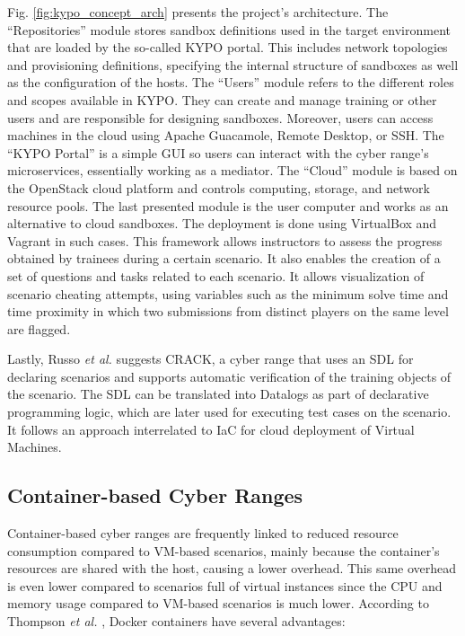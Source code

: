 Fig. \ref{fig:kypo_concept_arch} presents the project's architecture. The ``Repositories'' module stores sandbox definitions used in the target environment that are loaded by the so-called KYPO portal. This includes network topologies and provisioning definitions, specifying the internal structure of sandboxes as well as the configuration of the hosts. The ``Users'' module refers to the different roles and scopes available in KYPO. They can create and manage training or other users and are responsible for designing sandboxes. Moreover, users can access machines in the cloud using Apache Guacamole, Remote Desktop, or SSH. The ``KYPO Portal'' is a simple GUI so users can interact with the cyber range's microservices, essentially working as a mediator. The ``Cloud'' module is based on the OpenStack cloud platform and controls computing, storage, and network resource pools. The last presented module is the user computer and works as an alternative to cloud sandboxes. The deployment is done using VirtualBox and Vagrant in such cases. This framework allows instructors to assess the progress obtained by trainees during a certain scenario. It also enables the creation of a set of questions and tasks related to each scenario. It allows visualization of scenario cheating attempts, using variables such as the minimum solve time and time proximity in which two submissions from distinct players on the same level are flagged.

Lastly, Russo \textit{et al.} \cite{crack_ref} suggests CRACK, a cyber range that uses an SDL for declaring scenarios and supports automatic verification of the training objects of the scenario. The SDL can be translated into Datalogs as part of declarative programming logic, which are later used for executing test cases on the scenario. It follows an approach interrelated to IaC for cloud deployment of Virtual Machines. 

\subsection{Container-based Cyber Ranges}

Container-based cyber ranges are frequently linked to reduced resource consumption compared to VM-based scenarios, mainly because the container's resources are shared with the host, causing a lower overhead. This same overhead is even lower compared to scenarios full of virtual instances since the CPU and memory usage compared to VM-based scenarios is much lower. According to Thompson \textit{et al.} \cite{labtainers_ref}, Docker containers have several advantages:

